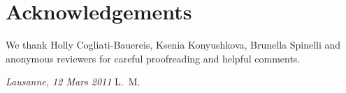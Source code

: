 \chapter*{Acknowledgements}

We thank Holly Cogliati-Bauereis, Ksenia Konyushkova, Brunella Spinelli and anonymous reviewers for careful proofreading and helpful comments.

\bigskip
 
\noindent\textit{Lausanne, 12 Mars 2011}
\hfill L.~M.
